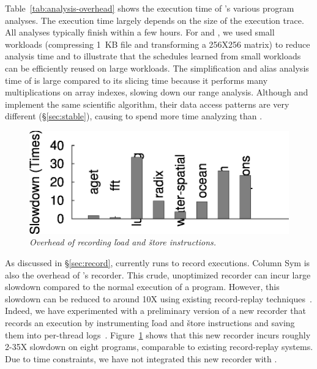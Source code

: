   Table~\ref{tab:analysis-overhead}
shows the execution time of \peregrine's various program analyses.  The
execution time largely depends on the size of the execution trace.  All
analyses typically finish within a few hours.  For \pbzip and \fft, we
used small workloads (compressing 1~KB file and transforming a 256X256
matrix) to reduce analysis time and to illustrate that the schedules
learned from small workloads can be efficiently reused on large workloads.
The simplification and alias analysis time of \fft is large compared to its
slicing time because it performs many multiplications on array indexes,
slowing down our range analysis.  Although \lun and \luc implement the
same scientific algorithm, their data access patterns are very different
(\S\ref{sec:stable}), causing \peregrine to spend more time analyzing \lun than \luc.

\begin{figure}[b!]
\centering
\includegraphics[width=.7\columnwidth]{peregrine/figures/new-recorder.eps}
\vspace{-.25in}
\caption{{\em Overhead of recording \v{load} and \v{store} instructions.}} \label{fig:new-recorder-overhead}
\end{figure}

As discussed in \S\ref{sec:record}, \peregrine currently runs \klee to record
executions.  Column Sym is also the overhead of \peregrine's recorder.  This
crude, unoptimized recorder can incur large slowdown compared to
the normal execution of a program.  However, this slowdown can be reduced
to around 10X using existing record-replay
techniques~\cite{idna:vee06,scribe:sigmetrics10}.  Indeed, we have
experimented with a preliminary version of a new recorder that records an
execution by instrumenting \v{load} and \v{store} instructions and saving
them into per-thread logs~\cite{idna:vee06}.  Figure~\ref{fig:new-recorder-overhead} shows that
this new recorder incurs roughly 2-35X slowdown on eight programs,
comparable to existing record-replay systems.  Due to time
constraints, we have not integrated this new recorder with \peregrine.

